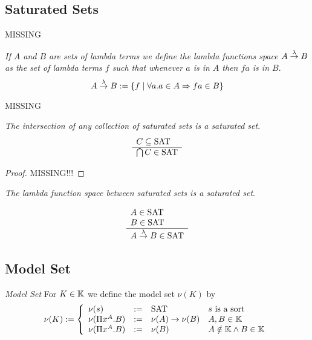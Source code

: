 \subsection{Saturated Sets}

MISSING



\begin{definition}
    \emph{If $A$ and $B$ are sets of lambda terms we define the lambda functions
    space $A \stackrel{\lambda}{\to} B$ as the set of lambda terms $f$ such that whenever $a$
    is in $A$ then $fa$ is in $B$}.
    $$
    A \stackrel{\lambda}{\to} B := {\{f \mid \forall a. a \in A \Rightarrow fa \in B\}}
    $$
\end{definition}

MISSING

\begin{theorem}
    \label{SaturatedSetsIntersection}
    \emph{The intersection of any collection of saturated sets is a saturated
    set}.
    $$
    \begin{array}{l} 
        C \subseteq \text{SAT}
     \\ \hline 
        \bigcap C \in \text{SAT}
    \end{array}
    $$
    \begin{proof}
        MISSING!!!
    \end{proof}
\end{theorem}





\begin{theorem}
    \label{LambdaSpaceSaturated}
    \emph{The lambda function space between saturated sets is a saturated set}.

    $$
    \begin{array}{l} 
        A \in \text{SAT}
        \\
        B \in \text{SAT}
     \\ \hline 
        A \stackrel{\lambda}{\to} B \in \text{SAT}
    \end{array}
    $$
\end{theorem}




\subsection{Model Set}

\begin{definition}
    \emph{Model Set} For $K \in \mathbb{K}$ we define the model set
    $\nu(K)$ by
    $$
        \nu(K) :=
        \left \{
        \begin{array}{llll}
            \nu(s) &:=& \text{SAT} & s \text{ is a sort}
            \\
            \nu(\Pi x^A. B) &:=& \nu(A)\to \nu(B) & A,B \in \mathbb{K}
            \\
            \nu(\Pi x^A. B) &:=& \nu(B) & A \notin \mathbb{K} \land B \in \mathbb{K}
        \end{array}
        \right.
    $$
\end{definition}



